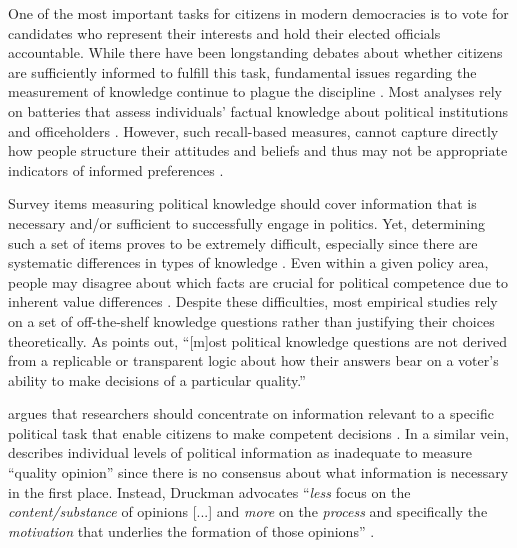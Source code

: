 
One of the most important tasks for citizens in modern democracies is to vote for candidates who represent their interests and hold their elected officials accountable. While there have been longstanding debates about whether citizens are sufficiently informed to fulfill this task, fundamental issues regarding the measurement of knowledge continue to plague the discipline \citep{mondak2001developing,sturgis2008experiment,pietryka2013analysis}. Most analyses rely on batteries that assess individuals' factual knowledge about political institutions and officeholders \citep[e.g.,][]{carpini1996americans}. However, such recall-based measures, cannot capture directly how people structure their attitudes and beliefs \citep[e.g.,][]{luskin1987measuring} and thus may not be appropriate indicators of informed preferences \citep{gilens2001political,lupia2006elitism}.

Survey items measuring political knowledge should cover information that is necessary and/or sufficient to successfully engage in politics. Yet, determining such a set of items proves to be extremely difficult, especially since there are systematic differences in types of knowledge \citep{barabas2014question}. Even within a given policy area, people may disagree about which facts are crucial for political competence due to inherent value differences \citep[c.f.,][]{lupia2015uninformed}. Despite these difficulties, most empirical studies rely on a set of off-the-shelf knowledge questions rather than justifying their choices theoretically. As \citet[219]{lupia2006elitism} points out, ``[m]ost political knowledge questions are not derived from a replicable or transparent logic about how their answers bear on a voter's ability to make decisions of a particular quality.'' 

\citet{lupia2006elitism} argues that researchers should concentrate on information relevant to a specific political task that enable citizens to make competent decisions \citep[see also][]{lupia1994shortcuts,lupia2015uninformed}. In a similar vein, \citet{druckman2014pathologies} describes individual levels of political information as inadequate to measure ``quality opinion'' since there is no consensus about what information is necessary in the first place. Instead, Druckman advocates ``\textit{less} focus on the \textit{content/substance} of opinions [...] and \textit{more} on the \textit{process} and specifically the \textit{motivation} that underlies the formation of those opinions'' \citeyearpar[478, emphasis in the original]{druckman2014pathologies}. 


